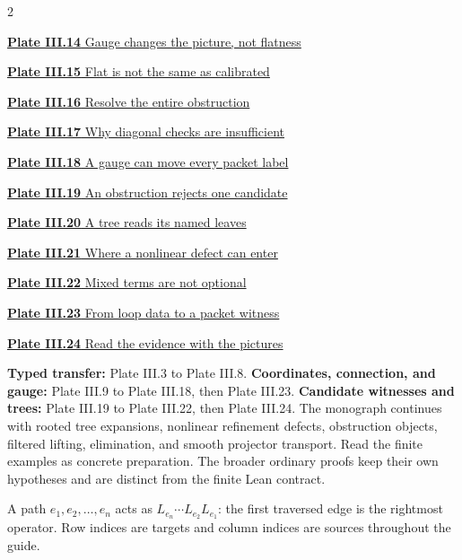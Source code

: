 \documentclass[11pt,letterpaper]{article}
\begin{document}
\begin{multicols}{2}
{\small\noindent\hyperlink{vpage14}{\textbf{Plate III.14} Gauge changes the picture, not flatness}\par\smallskip}
{\small\noindent\hyperlink{vpage15}{\textbf{Plate III.15} Flat is not the same as calibrated}\par\smallskip}
{\small\noindent\hyperlink{vpage16}{\textbf{Plate III.16} Resolve the entire obstruction}\par\smallskip}
{\small\noindent\hyperlink{vpage17}{\textbf{Plate III.17} Why diagonal checks are insufficient}\par\smallskip}
{\small\noindent\hyperlink{vpage18}{\textbf{Plate III.18} A gauge can move every packet label}\par\smallskip}
{\small\noindent\hyperlink{vpage19}{\textbf{Plate III.19} An obstruction rejects one candidate}\par\smallskip}
{\small\noindent\hyperlink{vpage20}{\textbf{Plate III.20} A tree reads its named leaves}\par\smallskip}
{\small\noindent\hyperlink{vpage21}{\textbf{Plate III.21} Where a nonlinear defect can enter}\par\smallskip}
{\small\noindent\hyperlink{vpage22}{\textbf{Plate III.22} Mixed terms are not optional}\par\smallskip}
{\small\noindent\hyperlink{vpage23}{\textbf{Plate III.23} From loop data to a packet witness}\par\smallskip}
{\small\noindent\hyperlink{vpage24}{\textbf{Plate III.24} Read the evidence with the pictures}\par\smallskip}

\end{multicols}
\medskip
{}
\textbf{Typed transfer:} Plate III.3 to Plate III.8.
\textbf{Coordinates, connection, and gauge:} Plate III.9 to Plate III.18, then Plate III.23.
\textbf{Candidate witnesses and trees:} Plate III.19 to Plate III.22, then Plate III.24.
The monograph continues with rooted tree expansions, nonlinear
refinement defects, obstruction objects, filtered lifting, elimination, and
smooth projector transport. Read the finite examples as concrete preparation.
The broader ordinary proofs keep their own hypotheses and are distinct from
the finite Lean contract.

A path $e_1,e_2,\ldots,e_n$ acts as $L_{e_n}\cdots L_{e_2}L_{e_1}$:
the first traversed edge is the rightmost operator. Row indices are targets
and column indices are sources throughout the guide.
\clearpage
{}
\begingroup
{}\fontsize{10}{12}\selectfont
\setlength{\parskip}{3pt}\setlength{\abovedisplayskip}{6pt}\setlength{\belowdisplayskip}{6pt}

\endgroup
\end{document}
